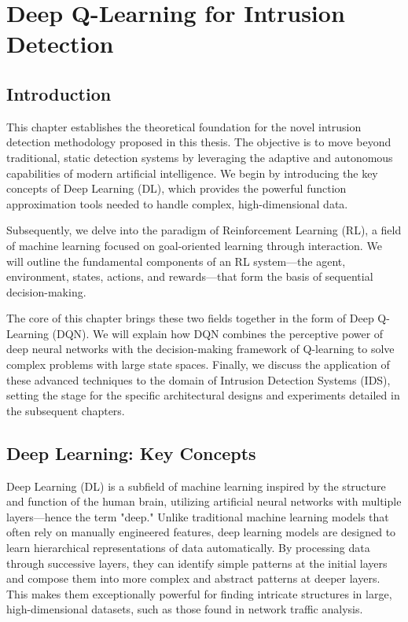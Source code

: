 \documentclass[12pt]{report}
\begin{document}
\chapter{Deep Q-Learning for Intrusion Detection}
\label{chap:dqn-for-ids}

\section{Introduction}
This chapter establishes the theoretical foundation for the novel intrusion detection methodology proposed in this thesis. The objective is to move beyond traditional, static detection systems by leveraging the adaptive and autonomous capabilities of modern artificial intelligence. We begin by introducing the key concepts of Deep Learning (DL), which provides the powerful function approximation tools needed to handle complex, high-dimensional data.

Subsequently, we delve into the paradigm of Reinforcement Learning (RL), a field of machine learning focused on goal-oriented learning through interaction. We will outline the fundamental components of an RL system—the agent, environment, states, actions, and rewards—that form the basis of sequential decision-making.

The core of this chapter brings these two fields together in the form of Deep Q-Learning (DQN). We will explain how DQN combines the perceptive power of deep neural networks with the decision-making framework of Q-learning to solve complex problems with large state spaces. Finally, we discuss the application of these advanced techniques to the domain of Intrusion Detection Systems (IDS), setting the stage for the specific architectural designs and experiments detailed in the subsequent chapters.

\section{Deep Learning: Key Concepts}
Deep Learning (DL) is a subfield of machine learning inspired by the structure and function of the human brain, utilizing artificial neural networks with multiple layers—hence the term "deep." Unlike traditional machine learning models that often rely on manually engineered features, deep learning models are designed to learn hierarchical representations of data automatically. By processing data through successive layers, they can identify simple patterns at the initial layers and compose them into more complex and abstract patterns at deeper layers. This makes them exceptionally powerful for finding intricate structures in large, high-dimensional datasets, such as those found in network traffic analysis.
\end{document}
